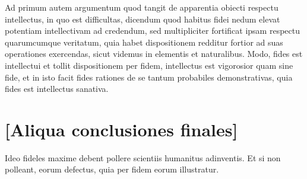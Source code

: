 \documentclass{article}
\begin{document}
        \pstart
        Ad primum autem argumentum quod tangit de apparentia obiecti respectu intellectus, in quo est difficultas, dicendum  quod habitus fidei nedum elevat potentiam intellectivam  ad credendum, sed multipliciter fortificat ipsam respectu quarumcumque veritatum, quia  habet dispositionem  redditur fortior ad suas operationes exercendas, sicut videmus in elementis et  naturalibus. Modo, fides est  intellectui et tollit dispositionem   per fidem, intellectus est vigorosior quam sine fide, et in isto facit fides rationes de se tantum probabiles  demonstrativas, quia fides est intellectus sanativa.
        \pend
       
        \bigskip
         \section*{ [Aliqua conclusiones finales] } 
        \pstart
        Ideo  fideles maxime debent pollere scientiis humanitus adinventis. Et si non polleant,  eorum defectus, quia per fidem eorum  illustratur.
        \pend
     
\end{document}
